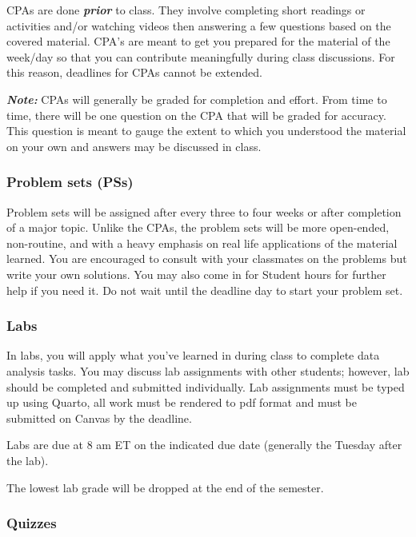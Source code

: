 \documentclass[
  letterpaper,
  DIV=11,
  numbers=noendperiod]{scrartcl}
\begin{document}
CPAs are done \textbf{\emph{prior}} to class. They involve completing
short readings or activities and/or watching videos then answering a few
questions based on the covered material. CPA's are meant to get you
prepared for the material of the week/day so that you can contribute
meaningfully during class discussions. For this reason, deadlines for
CPAs cannot be extended.

\textbf{\emph{Note:}} CPAs will generally be graded for completion and
effort. From time to time, there will be one question on the CPA that
will be graded for accuracy. This question is meant to gauge the extent
to which you understood the material on your own and answers may be
discussed in class.

\subsubsection{Problem sets (PSs)}\label{problem-sets-pss}

Problem sets will be assigned after every three to four weeks or after
completion of a major topic. Unlike the CPAs, the problem sets will be
more open-ended, non-routine, and with a heavy emphasis on real life
applications of the material learned. You are encouraged to consult with
your classmates on the problems but write your own solutions. You may
also come in for Student hours for further help if you need it. Do not
wait until the deadline day to start your problem set.

\subsubsection{Labs}\label{labs}

In labs, you will apply what you've learned in during class to complete
data analysis tasks. You may discuss lab assignments with other
students; however, lab should be completed and submitted individually.
Lab assignments must be typed up using Quarto, all work must be rendered
to pdf format and must be submitted on Canvas by the deadline.

Labs are due at 8 am ET on the indicated due date (generally the Tuesday
after the lab).

The lowest lab grade will be dropped at the end of the semester.

\subsubsection{Quizzes}\label{quizzes}
\end{document}
